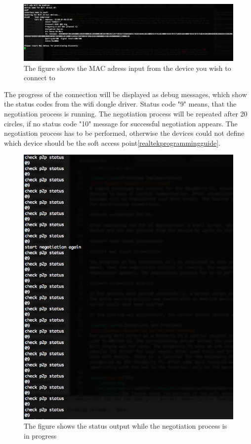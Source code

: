 \begin{figure}[!hb]
	\centering
  \includegraphics[width=\linewidth]{images/enterMac_screenshot.eps}
	\caption{The figure shows the MAC adress input from the device you wish to connect to}
	\label{fig1}
\end{figure}

\noindent The progress of the connection will be displayed as debug messages, which show the status codes from the wifi dongle driver. Status code "9" means, that the negotiation process is running. The negotiation process will be repeated after 20 circles, if no status code "10" message for successful negotiation appears. The negotiation process has to be performed, otherwise the devices could not define which device should be the soft access point\ref{realtekprogrammingguide}.

\begin{figure}[!hb]
	\centering
  \includegraphics[width=\linewidth]{images/status_screenshot.eps}
	\caption{The figure shows the status output while the negotiation process is in progress}
	\label{fig1}
\end{figure}

